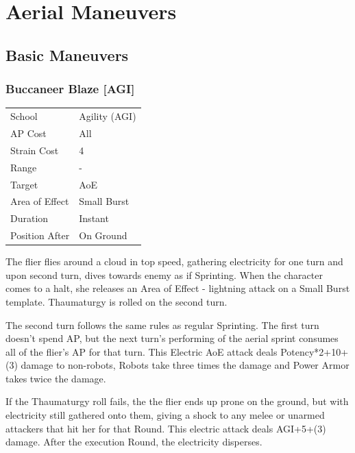 \documentclass[11pt,a4paper,twocolumn]{book}
\begin{document}
\chapter{Aerial Maneuvers}    

\section*{Basic Maneuvers} 


\subsection*{Buccaneer Blaze [AGI]}

{
	\begin{tabu} to 75mm{| X[l,4] | X[l,7] |}
		\hline
		School 			& Agility (AGI) \\
        AP Cost	      	& All 			\\
        Strain Cost     & 4 			\\
        Range     		& - 			\\
        Target      	& AoE 			\\
        Area of Effect  & Small Burst 	\\
        Duration     	& Instant 		\\
		Position After  & On Ground     \\ \hline
	\end{tabu}
		
}

\medskip
The flier flies around a cloud in top speed, gathering electricity for one turn and upon second turn, dives towards enemy as if Sprinting. When the character comes to a halt, she releases an Area of Effect - lightning attack on a Small Burst template. Thaumaturgy is rolled on the second turn.

The second turn follows the same rules as regular Sprinting. The first turn doesn't spend AP, but the next turn's performing of the aerial sprint consumes all of the flier's AP for that turn. This Electric AoE attack deals Potency*2+10+(3) damage to non-robots, Robots take three times the damage and Power Armor takes twice the damage.

If the Thaumaturgy roll fails, the the flier ends up prone on the ground, but with electricity still gathered onto them, giving a shock to any melee or unarmed attackers that hit her for that Round. This electric attack deals AGI+5+(3) damage. After the execution Round, the electricity disperses.
\end{document}
